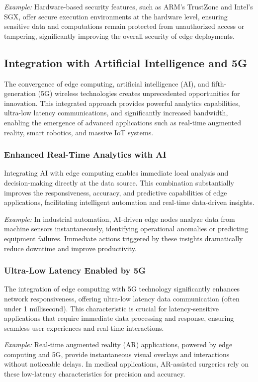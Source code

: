 \documentclass[runningheads]{llncs}
\begin{document}
\textit{Example:} Hardware-based security features, such as ARM's TrustZone and Intel's SGX, offer secure execution environments at the hardware level, ensuring sensitive data and computations remain protected from unauthorized access or tampering, significantly improving the overall security of edge deployments.


\subsection{Integration with Artificial Intelligence and 5G}

The convergence of edge computing, artificial intelligence (AI), and fifth-generation (5G) wireless technologies creates unprecedented opportunities for innovation. This integrated approach provides powerful analytics capabilities, ultra-low latency communications, and significantly increased bandwidth, enabling the emergence of advanced applications such as real-time augmented reality, smart robotics, and massive IoT systems.

\subsubsection{Enhanced Real-Time Analytics with AI}
Integrating AI with edge computing enables immediate local analysis and decision-making directly at the data source. This combination substantially improves the responsiveness, accuracy, and predictive capabilities of edge applications, facilitating intelligent automation and real-time data-driven insights.

\textit{Example:} In industrial automation, AI-driven edge nodes analyze data from machine sensors instantaneously, identifying operational anomalies or predicting equipment failures. Immediate actions triggered by these insights dramatically reduce downtime and improve productivity.

\subsubsection{Ultra-Low Latency Enabled by 5G}
The integration of edge computing with 5G technology significantly enhances network responsiveness, offering ultra-low latency data communication (often under 1 millisecond). This characteristic is crucial for latency-sensitive applications that require immediate data processing and response, ensuring seamless user experiences and real-time interactions.

\textit{Example:} Real-time augmented reality (AR) applications, powered by edge computing and 5G, provide instantaneous visual overlays and interactions without noticeable delays. In medical applications, AR-assisted surgeries rely on these low-latency characteristics for precision and accuracy.
\end{document}
